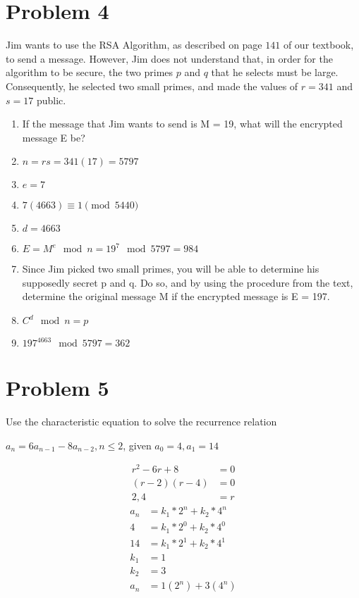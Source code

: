 \documentclass{article}
\newenvironment{problem}[1]{
  \nobreak\section*{Problem #1}
}{}
\begin{document}
  \begin{problem}{4}
    Jim wants to use the RSA Algorithm, as described on page $141$ of our textbook, to send a message. However, Jim does not understand that, in order for the algorithm to be secure, the two primes $p$ and $q$ that he selects must be large. Consequently, he selected two small primes, and made the values of $r = 341$ and $s = 17$ public.
    \begin{enumerate}
      \item [] If the message that Jim wants to send is M = 19, what will the encrypted message E be?
      \item [] $n = rs = 341(17) = 5797$
      \item [] $e = 7$
      \item [] $7(4663) \equiv 1 \pmod{5440}$
      \item [] $d = 4663$
      \item [] $E = M^e \mod n = 19^7 \mod 5797 = 984$
      \item [] Since Jim picked two small primes, you will be able to determine his supposedly secret p and q. Do so, and by using the procedure from the text, determine the original message M if the encrypted message is E = 197.
      \item [] $C^d \mod n = p$
      \item [] $197^{4663} \mod 5797 = 362$
    \end{enumerate}
  \end{problem}

  \begin{problem}{5}
    Use the characteristic equation to solve the recurrence relation
    \begin{center}
      $a_n = 6a_{n-1} - 8a_{n-2}, n \le 2$, given $a_0 = 4, a_1 = 14$
    \end{center}
    \begin{equation*}
      \begin{split}
        r^2 - 6r + 8 & = 0\\
        (r - 2)(r - 4) & = 0\\
        2, 4 & = r
      \end{split}
    \end{equation*}
    \begin{equation*}
      \begin{split}
        a_n & = k_1 * 2^n + k_2 * 4^n\\
        4 & = k_1 * 2^0 + k_2 * 4^0\\
        14 & = k_1 * 2^1 + k_2 * 4^1\\
        k_1 & = 1\\
        k_2 & = 3\\
        a_n & = 1(2^n) + 3(4^n)
      \end{split}
    \end{equation*}
  \end{problem}
\end{document}
